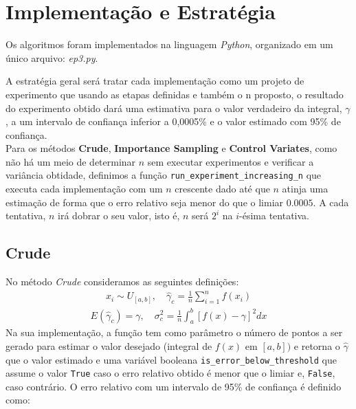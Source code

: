 \documentclass[twocolumn,amsmath,amssymb,floatfix]{revtex4}
\begin{document}
\section{Implementação e Estratégia}

Os algoritmos foram implementados na linguagem \textit{Python}, organizado em um único arquivo: \textit{ep3.py}.

A estratégia geral será tratar cada implementação como um projeto de experimento que usando as etapas definidas e também o n proposto, o resultado do experimento obtido dará uma estimativa para o valor verdadeiro da integral, $\gamma$, a um intervalo de confiança inferior a 0,0005\% e o valor estimado com 95\% de confiança.\\

Para os métodos \textbf{Crude}, \textbf{Importance Sampling} e \textbf{Control Variates}, como não há um meio de determinar $n$ sem executar experimentos e verificar a variância obtidade, definimos a função \verb|run_experiment_increasing_n| que executa cada implementação com um $n$ crescente dado até que $n$ atinja uma estimação de forma que o erro relativo seja menor do que o limiar $0.0005$. A cada tentativa, $n$ irá dobrar o seu valor, isto é, $n$ será $2^i$ na $i$-ésima tentativa.\\


\subsection{Crude}

No método \textit{Crude} consideramos as seguintes definições:
\begin{eqnarray}
x_{i} \sim U_{[a,b]},\quad \hat{\gamma}_{c} = \frac{1}{n}\sum_{i=1}^{n}f(x_{i})
\end{eqnarray}
\begin{eqnarray}
E(\hat{\gamma}_{c}) = \gamma,\quad \sigma_{c}^{2} = \frac{1}{n}\int_{a}^{b}[f(x) - \gamma]^{2}dx
\end{eqnarray}
Na sua implementação, a função tem como parâmetro o número de pontos a ser gerado para estimar o valor desejado (integral de $f(x)$ em $[a,b])$ e retorna o $\hat{\gamma}$ que o valor estimado e uma variável booleana \verb|is_error_below_threshold| que assume o valor \verb|True| caso o erro relativo obtido é menor que o limiar e, \verb|False|, caso contrário. O erro relativo com um intervalo de 95\% de confiança é definido como:
\end{document}

